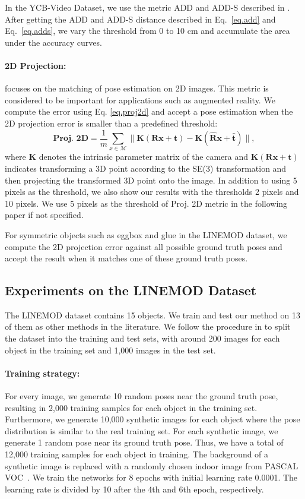 \documentclass[twocolumn]{svjour3}
\begin{document}
In the YCB-Video Dataset, we use the metric ADD and ADD-S described in \cite{xiang2017posecnn}. After getting the ADD and ADD-S distance described in Eq.~\ref{eq.add} and Eq.~\ref{eq.adds}, we vary the threshold from 0 to 10 cm and accumulate the area under the accuracy curves.

\paragraph{2D Projection:} focuses on the matching of pose estimation on 2D images. This metric is considered to be important for applications such as augmented reality. We compute the error using Eq. \ref{eq.proj2d} and accept a pose estimation when the 2D projection error is smaller than a predefined threshold:
\begin{equation}
\label{eq.proj2d}
\textbf{Proj. 2D}=\frac{1}{m}\sum_{x\in \mathcal{M}}\|\mathbf{K}(\mathbf{R}\mathbf{x}+\mathbf{t}) - \mathbf{K}(\mathbf{\hat{R}}\mathbf{x}+\mathbf{\hat{t}})\|,
\end{equation}
where $\mathbf{K}$ denotes the intrinsic parameter matrix of the camera and $\mathbf{K}(\mathbf{R}\mathbf{x}+\mathbf{t})$ indicates transforming a 3D point according to the SE(3) transformation and then projecting the transformed 3D point onto the image. In addition to using 5 pixels as the threshold, we also show our results with the thresholds 2 pixels and 10 pixels. We use 5 pixels as the threshold of Proj. 2D metric in the following paper if not specified.


For symmetric objects such as eggbox and glue in the LINEMOD dataset, we compute the 2D projection error against all possible ground truth poses and accept the result when it matches one of these ground truth poses.

\subsection{Experiments on the LINEMOD Dataset}
\label{sec.exp_on_LM}
The LINEMOD dataset contains 15 objects. We train and test our method on 13 of them as other methods in the literature. We follow the procedure in \citep{brachmann2016uncertainty} to split the dataset into the training and test sets, with around 200 images for each object in the training set and 1,000 images in the test set.

\paragraph{Training strategy:}%
%
For every image, we generate 10 random poses near the ground truth pose, resulting in 2,000 training samples for each object in the training set. Furthermore, we generate 10,000 synthetic images for each object where the pose distribution is similar to the real training set. For each synthetic image, we generate 1 random pose near its ground truth pose. Thus, we have a total of 12,000 training samples for each object in training. The background of a synthetic image is replaced with a randomly chosen indoor image from PASCAL VOC~\citep{everingham2010pascal}. We train the networks for 8 epochs with initial learning rate 0.0001. The learning rate is divided by 10 after the 4th and 6th epoch, respectively.
\end{document}
